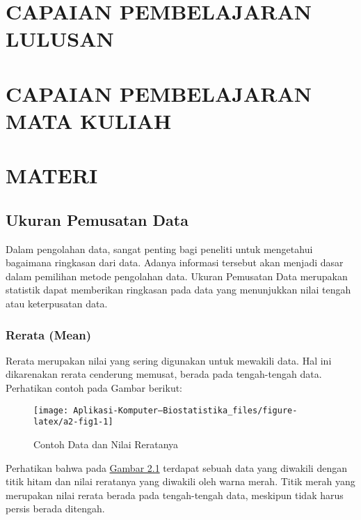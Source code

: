 \documentclass[
]{book}
\begin{document}
\hypertarget{capaian-pembelajaran-lulusan}{%
\section{CAPAIAN PEMBELAJARAN LULUSAN}\label{capaian-pembelajaran-lulusan}}

\hypertarget{capaian-pembelajaran-mata-kuliah}{%
\section{CAPAIAN PEMBELAJARAN MATA KULIAH}\label{capaian-pembelajaran-mata-kuliah}}

\hypertarget{a2-materi}{%
\section{MATERI}\label{a2-materi}}

\hypertarget{ukuran-pemusatan-data}{%
\subsection{Ukuran Pemusatan Data}\label{ukuran-pemusatan-data}}

Dalam pengolahan data, sangat penting bagi peneliti untuk mengetahui bagaimana ringkasan dari data. Adanya informasi tersebut akan menjadi dasar dalam pemilihan metode pengolahan data. Ukuran Pemusatan Data merupakan statistik dapat memberikan ringkasan pada data yang menunjukkan nilai tengah atau keterpusatan data.

\hypertarget{rerata-mean}{%
\subsubsection{Rerata (Mean)}\label{rerata-mean}}

Rerata merupakan nilai yang sering digunakan untuk mewakili data. Hal ini dikarenakan rerata cenderung memusat, berada pada tengah-tengah data. Perhatikan contoh pada Gambar berikut:

\begin{figure}

{\centering \texttt{[image: Aplikasi-Komputer---Biostatistika\_files/figure-latex/a2-fig1-1]} 

}

\caption{Contoh Data dan Nilai Reratanya}\label{fig:a2-fig1}
\end{figure}

Perhatikan bahwa pada \protect\hyperlink{fig:a2-fig1}{Gambar 2.1} terdapat sebuah data yang diwakili dengan titik hitam dan nilai reratanya yang diwakili oleh warna merah. Titik merah yang merupakan nilai rerata berada pada tengah-tengah data, meskipun tidak harus persis berada ditengah.
\end{document}
